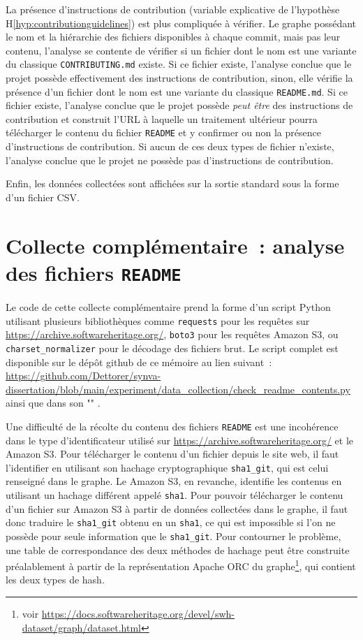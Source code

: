 La présence d'instructions de contribution (variable explicative de l'hypothèse
H\ref{hyp:contributionguidelines}) est plus compliquée à vérifier. Le graphe possédant le nom et la hiérarchie
des fichiers disponibles à chaque \gls{commit}, mais pas leur contenu, l'analyse se contente de vérifier si un
fichier dont le nom est une variante du classique \texttt{CONTRIBUTING.md} existe. Si ce fichier existe,
l'analyse conclue que le projet possède effectivement des instructions de contribution, sinon, elle vérifie la
présence d'un fichier dont le nom est une variante du classique \texttt{README.md}. Si ce fichier existe,
l'analyse conclue que le projet possède \emph{peut être} des instructions de contribution et construit l'URL à
laquelle un traitement ultérieur pourra télécharger le contenu du fichier \texttt{README} et y confirmer ou
non la présence d'instructions de contribution. Si aucun de ces deux types de fichier n'existe, l'analyse
conclue que le projet ne possède pas d'instructions de contribution.

Enfin, les données collectées sont affichées sur la sortie standard sous la forme d'un fichier CSV.

\section{Collecte complémentaire : analyse des fichiers \texttt{README}}
\label{app:checkreadme.py}

Le code de cette collecte complémentaire prend la forme d'un script Python utilisant plusieurs bibliothèques
comme \texttt{requests} pour les requêtes sur \url{https://archive.softwareheritage.org/}, \texttt{boto3} pour
les requêtes Amazon S3, ou \texttt{charset\_normalizer} pour le décodage des fichiers brut. Le script complet
est disponible sur le dépôt \gls{github} de ce mémoire au lien suivant :
\url{https://github.com/Dettorer/synva-dissertation/blob/main/experiment/data_collection/check_readme_contents.py}
ainsi que dans son "" \parencite{replication-package}.

Une difficulté de la récolte du contenu des fichiers \texttt{README} est une incohérence dans le type
d'identificateur utilisé sur \url{https://archive.softwareheritage.org/} et le  Amazon S3. Pour
télécharger le contenu d'un fichier depuis le site web, il faut l'identifier en utilisant son hachage
cryptographique \texttt{sha1\_git}, qui est celui renseigné dans le graphe. Le  Amazon S3, en
revanche, identifie les contenus en utilisant un hachage différent appelé \texttt{sha1}. Pour pouvoir
télécharger le contenu d'un fichier sur Amazon S3 à partir de données collectées dans le graphe, il faut donc
traduire le \texttt{sha1\_git} obtenu en un \texttt{sha1}, ce qui est impossible si l'on ne possède pour seule
information que le \texttt{sha1\_git}. Pour contourner le problème, une table de correspondance des deux
méthodes de hachage peut être construite préalablement à partir de la représentation Apache ORC du
graphe\footnote{voir \url{https://docs.softwareheritage.org/devel/swh-dataset/graph/dataset.html}}, qui
contient les deux types de hash.

